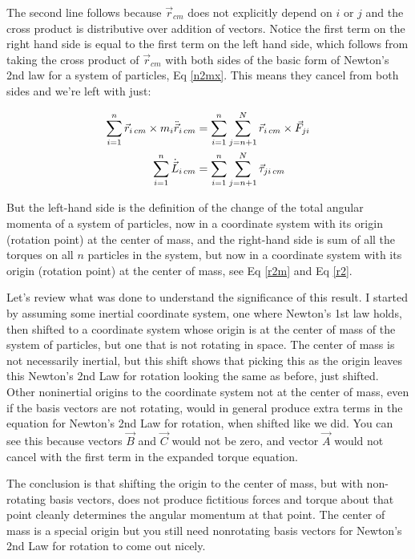 \documentclass[10pt]{article}
\begin{document}
The second line follows because $\vec{r}_{cm}$ does not explicitly depend 
on $i$ or $j$ and the cross product is distributive over addition of vectors. 
Notice the first term on the right hand side is equal to the first term 
on the left hand side, which follows from taking the cross product of 
$\vec{r}_{cm}$ with both sides of the basic form of Newton's 2nd law for 
a system of particles, Eq \ref{n2mx}. This means they cancel from both sides 
and we're left with just:

\begin{align}
        \sum_{i=1}^n\vec{r}_{i\,cm}\times m_i\ddot{\vec{r}}_{i\,cm} &= 
        \sum_{i=1}^n\sum_{j=n+1}^N\vec{r}_{i\,cm}\times\vec{F}_{ji} \notag\\
        \sum_{i=1}^n \dot{\vec{L}}_{i\,cm} &= 
        \sum_{i=1}^n\sum_{j=n+1}^N\vec{\tau}_{ji\,cm} \label{r2mcm}
\end{align}

But the left-hand side is the definition of the change of the total 
angular momenta of a system of particles, now in a coordinate system with
its origin (rotation point) at the center of mass, and the right-hand 
side is sum of all the torques on all $n$ particles in the system, but 
now in a coordinate system with its origin (rotation point) 
at the center of mass, see Eq \ref{r2m} and Eq \ref{r2}.

Let's review what was done to understand the significance of this result. 
I started by assuming some inertial coordinate system, one where Newton's 1st 
law holds, then shifted to a coordinate system whose origin is at the 
center of mass of the system of particles, but one that is not rotating 
in space.
The center of mass is not necessarily inertial, but this shift shows that 
picking this as the origin leaves this Newton's 2nd Law for rotation 
looking the same as before, just shifted. Other noninertial
origins to the coordinate system not at the center of mass, 
even if the basis vectors are not rotating, would in general produce 
extra terms in the equation for Newton's 2nd Law for rotation, when shifted
like we did. You can see this because vectors $\vec{B}$ and $\vec{C}$ would 
not be zero, and vector $\vec{A}$ would not cancel with the first term in 
the expanded torque equation.
 
The conclusion is that 
shifting the origin to the center of mass, but with non-rotating 
basis vectors, does not produce fictitious forces and torque about that 
point cleanly determines the angular momentum at that point. 
The center of mass is a special origin but you still need 
nonrotating basis vectors for Newton's 2nd Law for rotation to come out 
nicely. 
\end{document}
